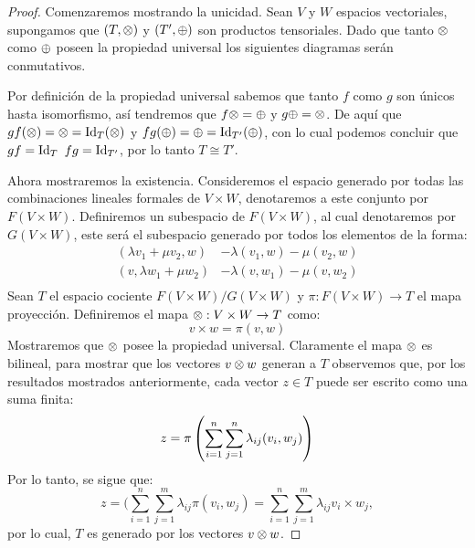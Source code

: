 \begin{proof}
	Comenzaremos mostrando la unicidad. Sean $V$ y $W$ espacios vectoriales,
	supongamos que $(T,\otimes)$ y $(T',\oplus)$ son productos tensoriales. Dado que
	tanto $\otimes$ como $\oplus$ poseen la propiedad universal los siguientes diagramas
	serán conmutativos.
	\begin{figure}[h]
		\center
		
	\end{figure}
	Por definición de la propiedad universal sabemos que tanto $f$ como $g$ son
	únicos hasta isomorfismo, así tendremos que $f\otimes = \oplus$ y $g\oplus = \otimes$. De
	aquí que $gf(\otimes) = \otimes = \mathrm{Id}_{T}(\otimes)$ y $fg(\oplus) = \oplus = \mathrm{Id}_{T'}(\oplus)$,
	con lo cual podemos concluir que $gf =\mathrm{Id}_{T}$ $fg = \mathrm{Id}_{T'}$, por lo tanto
	$T \cong T'$.

	Ahora mostraremos la existencia. Consideremos el espacio generado por todas
	las combinaciones lineales formales de $V \times W$, denotaremos a este
	conjunto por $F(V \times W)$. Definiremos un subespacio de $F(V \times W)$,
	al cual denotaremos por $G(V \times W)$, este será el subespacio generado por
	todos los elementos de la forma:
	\begin{align*}
		(\lambda v_1 + \mu v_2, w) & - \lambda(v_1, w) - \mu(v_2, w) \\
		(v, \lambda w_1 + \mu w_2) & - \lambda(v, w_1) - \mu(v, w_2) \\
	\end{align*}
	Sean $T$ el espacio cociente $F(V \times W) / G(V \times W)$ y $\pi:
		F(V \times W) \to T$ el mapa proyección. Definiremos el mapa $\otimes: V
		\times W \to T$ como:
	\[ v \times w = \pi(v,w) \]
	Mostraremos que $\otimes$ posee la propiedad universal. Claramente el mapa $\otimes$
	es bilineal, para mostrar que los vectores $v \otimes w$ generan a $T$ observemos
	que, por los resultados mostrados anteriormente, cada vector $z \in T$ puede
	ser escrito como una suma finita:
	\[ z = \pi \left(\sum_{i=1}^n\sum_{j=1}^{n} \lambda_{ij}(v_i,w_j)\right) \]
	Por lo tanto, se sigue que:
	\[
		z = (\sum_{i=1}^n\sum_{j=1}^{m} \lambda_{ij}\pi(v_i,w_j)
		= \sum_{i=1}^n\sum_{j=1}^{m} \lambda_{ij} v_i \times w_j,
	\]
	por lo cual, $T$ es generado por los vectores $v \otimes w$.


\end{proof}
